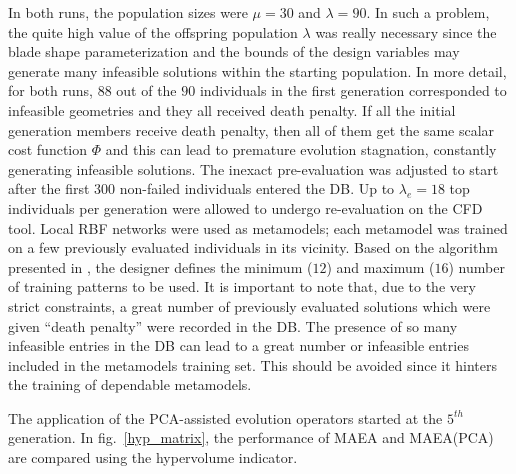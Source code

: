 In both runs, the  population sizes were $\mu\!=\!30$ and $\lambda\!=\!90$. In such a problem, the quite high value of the offspring population $\lambda$ was really necessary since the blade shape parameterization and the bounds of the design variables may generate many infeasible solutions  within the starting population. In more detail, for both runs, $88$ out of the $90$ individuals in the first generation corresponded to infeasible geometries and they all received death penalty. If all the initial generation members receive death penalty, then all of them get the same scalar cost function $\Phi$ and this can lead to premature evolution stagnation, constantly generating infeasible solutions. The inexact pre-evaluation was adjusted to start after the first $300$ non-failed individuals entered the DB. Up to $\lambda_e\!=\!18$ top individuals per generation were allowed to undergo re-evaluation on the CFD tool. Local  RBF networks were used as metamodels; each metamodel was trained on a few previously evaluated individuals in its vicinity. Based on the algorithm presented in \cite{LTT_2_029}, the designer defines the minimum ($12$) and maximum ($16$) number of training patterns to be used. It is important to note that, due to the very strict constraints, a great number of previously evaluated solutions which were given ``death penalty'' were recorded in the DB. The presence of so many infeasible entries in the DB can lead to a great number or infeasible entries included in the metamodels training set. This should be avoided since it hinters the training of dependable metamodels.

The application of the PCA-assisted evolution operators started at the $5^{th}$ generation. In fig.\ \ref{hyp_matrix}, the performance of MAEA and MAEA(PCA) are compared using the hypervolume indicator.



